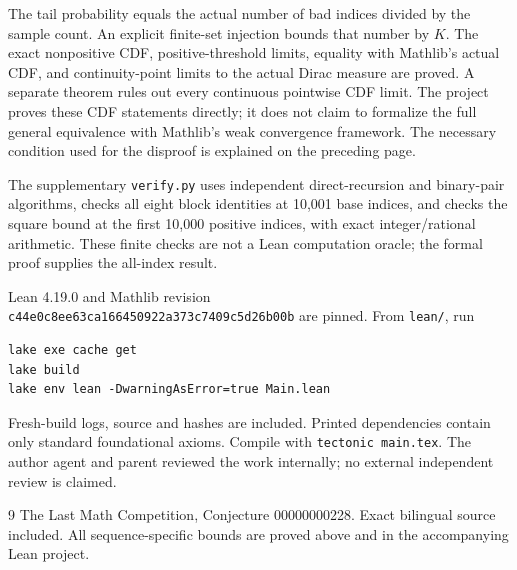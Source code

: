 \documentclass[11pt]{article}
\begin{document}
The tail probability equals the actual number of
bad indices divided by the sample count. An explicit
finite-set injection bounds that number by $K$.
The exact nonpositive CDF, positive-threshold limits,
equality with Mathlib's actual CDF, and continuity-point
limits to the actual Dirac measure are proved.
A separate theorem rules out every continuous
pointwise CDF limit. The project proves these CDF
statements directly; it does not claim to formalize
the full general equivalence with Mathlib's weak
convergence framework. The necessary condition used
for the disproof is explained on the preceding page.

The supplementary \texttt{verify.py} uses independent
direct-recursion and binary-pair algorithms, checks
all eight block identities at 10,001 base indices,
and checks the square bound at the first 10,000
positive indices, with exact integer/rational arithmetic.
These finite checks are not a Lean computation oracle;
the formal proof supplies the all-index result.

Lean 4.19.0 and Mathlib revision\\
\texttt{c44e0c8ee63ca166450922a373c7409c5d26b00b}
are pinned. From \texttt{lean/}, run
\begin{verbatim}
lake exe cache get
lake build
lake env lean -DwarningAsError=true Main.lean
\end{verbatim}
Fresh-build logs, source and hashes are included.
Printed dependencies contain only standard foundational
axioms. Compile with \texttt{tectonic main.tex}.
The author agent and parent reviewed the work internally;
no external independent review is claimed.

\begin{thebibliography}{9}
 The Last Math Competition,
Conjecture 00000000228. Exact bilingual source included.
All sequence-specific bounds are proved above and in
the accompanying Lean project.
\end{thebibliography}
\end{document}
